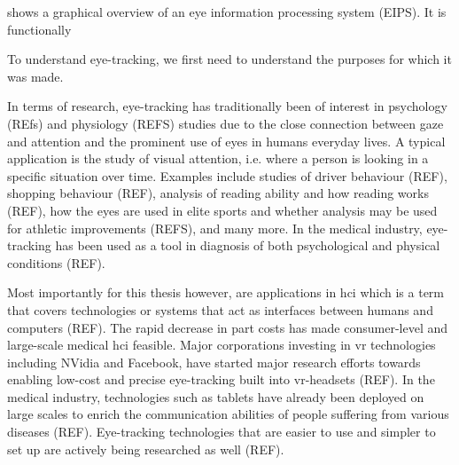  shows a graphical overview of an eye information processing system (EIPS). It is functionally 



To understand \gls{eye-tracking}, we first need to understand the purposes for which it was made. 

In terms of research, \gls{eye-tracking} has traditionally been of interest in psychology (REfs) and physiology (REFS) studies due to the close connection between gaze and attention and the prominent use of eyes in humans everyday lives. A typical application is the study of visual attention, i.e. where a person is looking in a specific situation over time. Examples include studies of driver behaviour (REF), shopping behaviour (REF), analysis of reading ability and how reading works (REF), how the eyes are used in elite sports and whether analysis may be used for athletic improvements (REFS), and many more. In the medical industry, eye-tracking has been used as a tool in diagnosis of both psychological and physical conditions (REF). 

Most importantly for this thesis however, are applications in \acrfull{hci} which is a term that covers technologies or systems that act as interfaces between humans and computers (REF). The rapid decrease in part costs has made consumer-level and large-scale medical \acrlong{hci} feasible. Major corporations investing in \acrfull{vr} technologies including NVidia and Facebook, have started major research efforts towards enabling low-cost and precise eye-tracking built into \acrshort{vr}-headsets (REF). In the medical industry, technologies such as tablets have already been deployed on large scales to enrich the communication abilities of people suffering from various diseases (REF). Eye-tracking technologies that are easier to use and simpler to set up are actively being researched as well (REF). 


